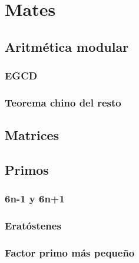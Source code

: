 \chapter{Mates}
\section{Aritmética modular}
\subsection{EGCD}
\subsection{Teorema chino del resto}

\section{Matrices}
\section{Primos}
\subsection{6n-1 y 6n+1}
\subsection{Eratóstenes}
\subsection{Factor primo más pequeño}

